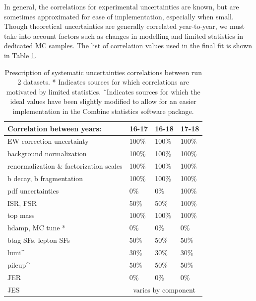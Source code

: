 In general, the correlations for experimental uncertainties are known, but are sometimes approximated for ease of implementation, especially when small.
Though theoretical uncertainties are generally correlated year-to-year, we must take into account factors such as changes in modelling and limited statistics in dedicated MC samples. The list of correlation values used in the final fit is shown in Table \ref{tab:run2corr}.
\begin{table}[h]
    \centering
\begin{tabular}{|l|l|l|l|}
\hline
Correlation between years:              & 16-17  & 16-18  & 17-18  \\ \hline \hline
EW correction uncertainty               & 100\%  & 100\%  & 100\%  \\ \hline
background normalization                & 100\%  & 100\%  & 100\%  \\ \hline
renormalization \& factorization scales & 100\%  & 100\%  & 100\%  \\ \hline
b decay, b fragmentation                                 & 100\%  & 100\%  & 100\%  \\ \hline
pdf uncertainties                       & 0\%    & 0\%    & 100\%  \\ \hline
ISR, FSR               & 50\%   & 50\%   & 100\%  \\ \hline
top mass                                & 100\%  & 100\%  & 100\%   \\ \hline
hdamp, MC tune *                        & 0\%    & 0\%    & 0\%    \\ \hline \hline
btag SFs, lepton SFs                    & 50\%   & 50\%   & 50\%   \\ \hline
lumi\^                                  & 30\%   & 30\%   & 30\%   \\ \hline
pileup\^                                & 50\%   & 50\%   & 50\%   \\ \hline
JER                                     & 0\%    & 0\%    & 0\%    \\ \hline
JES                                     & \multicolumn{3}{c|}{varies by component} \\ \hline
\end{tabular}
    \caption{Prescription of systematic uncertainties correlations between run 2 datasets. * Indicates sources for which correlations are motivated by limited statistics. \^\ Indicates sources for which the ideal values have been  slightly modified to allow for an easier implementation in the Combine statistics software package.}
    \label{tab:run2corr}
\end{table}

